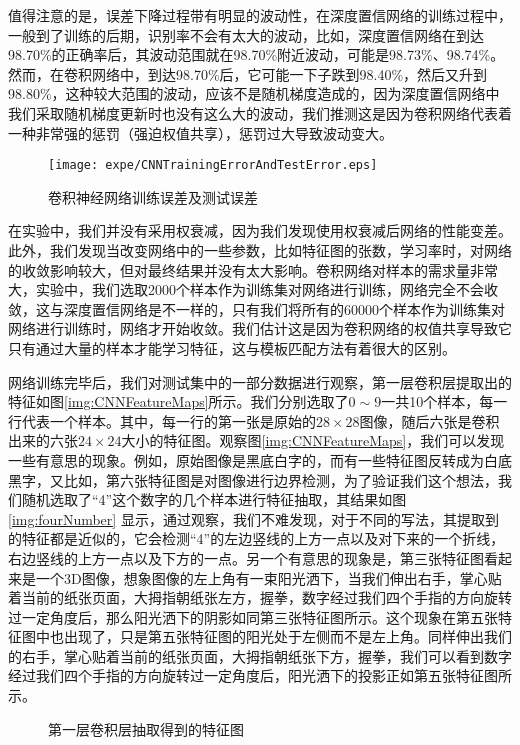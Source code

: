 值得注意的是，误差下降过程带有明显的波动性，在深度置信网络的训练过程中，一般到了训练的后期，识别率不会有太大的波动，比如，深度置信网络在到达98.70\%的正确率后，其波动范围就在98.70\%附近波动，可能是98.73\%、98.74\%。然而，在卷积网络中，到达98.70\%后，它可能一下子跌到98.40\%，然后又升到98.80\%，这种较大范围的波动，应该不是随机梯度造成的，因为深度置信网络中我们采取随机梯度更新时也没有这么大的波动，我们推测这是因为卷积网络代表着一种非常强的惩罚（强迫权值共享），惩罚过大导致波动变大。

\begin{figure}[!htbp]
\centering
\texttt{[image: expe/CNNTrainingErrorAndTestError.eps]}
\caption{卷积神经网络训练误差及测试误差}
\label{img:CNNTrainingErrorAndTestError}
\end{figure}

在实验中，我们并没有采用权衰减，因为我们发现使用权衰减后网络的性能变差。此外，我们发现当改变网络中的一些参数，比如特征图的张数，学习率时，对网络的收敛影响较大，但对最终结果并没有太大影响。卷积网络对样本的需求量非常大，实验中，我们选取2000个样本作为训练集对网络进行训练，网络完全不会收敛，这与深度置信网络是不一样的，只有我们将所有的60000个样本作为训练集对网络进行训练时，网络才开始收敛。我们估计这是因为卷积网络的权值共享导致它只有通过大量的样本才能学习特征，这与模板匹配方法有着很大的区别。

网络训练完毕后，我们对测试集中的一部分数据进行观察，第一层卷积层提取出的特征如图\ref{img:CNNFeatureMaps}所示。我们分别选取了$0\sim 9$一共10个样本，每一行代表一个样本。其中，每一行的第一张是原始的$28\times 28$图像，随后六张是卷积出来的六张$24\times 24$大小的特征图。观察图\ref{img:CNNFeatureMaps}，我们可以发现一些有意思的现象。例如，原始图像是黑底白字的，而有一些特征图反转成为白底黑字，又比如，第六张特征图是对图像进行边界检测，为了验证我们这个想法，我们随机选取了“4”这个数字的几个样本进行特征抽取，其结果如图\ref{img:fourNumber} 显示，通过观察，我们不难发现，对于不同的写法，其提取到的特征都是近似的，它会检测“4”的左边竖线的上方一点以及对下来的一个折线，右边竖线的上方一点以及下方的一点。另一个有意思的现象是，第三张特征图看起来是一个3D图像，想象图像的左上角有一束阳光洒下，当我们伸出右手，掌心贴着当前的纸张页面，大拇指朝纸张左方，握拳，数字经过我们四个手指的方向旋转过一定角度后，那么阳光洒下的阴影如同第三张特征图所示。这个现象在第五张特征图中也出现了，只是第五张特征图的阳光处于左侧而不是左上角。同样伸出我们的右手，掌心贴着当前的纸张页面，大拇指朝纸张下方，握拳，我们可以看到数字经过我们四个手指的方向旋转过一定角度后，阳光洒下的投影正如第五张特征图所示。

\begin{figure}[htbp]
\centering
\subfigure{\label{img:CNNFeatureMaps}}\addtocounter{subfigure}{-2}
\subfigure{\label{img:fourNumber}}\addtocounter{subfigure}{-2}
\caption{第一层卷积层抽取得到的特征图}
\label{img:CNNferture}
\vspace{-1em}
\end{figure}



